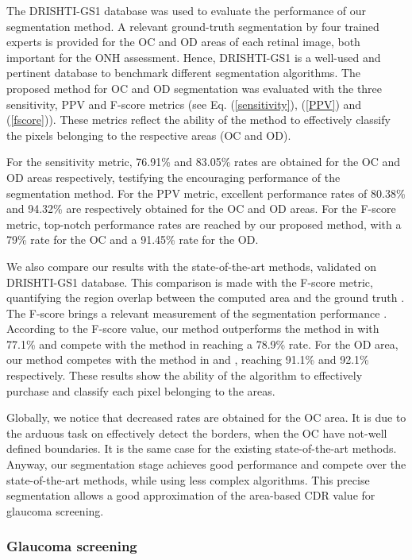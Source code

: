 The DRISHTI-GS1 database was used to evaluate the performance of our segmentation method. A relevant ground-truth segmentation by four trained experts is provided for the OC and OD areas of each retinal image, both important for the ONH assessment. Hence, DRISHTI-GS1 is a well-used and pertinent database to benchmark different segmentation algorithms.
The proposed method for OC and OD segmentation was evaluated with the three sensitivity, PPV and F-score metrics (see Eq. (\ref{sensitivity}), (\ref{PPV}) and (\ref{fscore})). These metrics reflect the ability of the method to effectively classify the pixels belonging to the respective areas (OC and OD). 

For the sensitivity metric, 76.91\% and 83.05\% rates are obtained for the OC and OD areas respectively, testifying the encouraging performance of the segmentation method. 
For the PPV metric, excellent performance rates of 80.38\% and 94.32\% are respectively obtained for the OC and OD areas.
For the F-score metric, top-notch performance rates are reached by our proposed method, with a 79\% rate for the OC and a 91.45\% rate for the OD.

We also compare our results with the state-of-the-art methods, validated on DRISHTI-GS1 database. This comparison is made with the F-score metric, quantifying the region overlap between the computed area and the ground truth \citep{sivaswamy2014drishti}. The F-score brings a relevant measurement of the segmentation performance \citep{joshi}.
According to the F-score value, our method outperforms the method in \citet{cdr} with 77.1\% and compete with the method in \citet{cheng} reaching a 78.9\% rate. For the OD area, our method competes with the method in \citet{cdr} and \citet{cheng}, reaching 91.1\% and 92.1\% respectively.
These results show the ability of the algorithm to effectively purchase and classify each pixel belonging to the areas.

Globally, we notice that decreased rates are obtained for the OC area. It is due to the arduous task on effectively detect the borders, when the OC have not-well defined boundaries. It is the same case for the existing state-of-the-art methods.
Anyway, our segmentation stage achieves good performance and compete over the state-of-the-art methods, while using less complex algorithms. This precise segmentation allows a good approximation of the area-based CDR value for glaucoma screening.


\subsubsection{\label{glaucoma_screening_results}Glaucoma screening}


